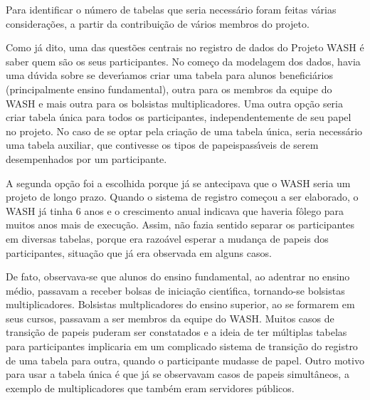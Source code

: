 \documentclass[
12pt,		%
openright,	%
twoside,  %
a4paper,			%
chapter=TITLE,		%
english,			%
french,				%
spanish,			%
brazil				%
]{USPSC-classe/USPSC}
\begin{document}
Para identificar o n\'umero de tabelas que seria necess\'ario foram feitas v\'arias considera\c{c}\~oes, a partir da contribui\c{c}\~ao de v\'arios membros do projeto.














Como j\'a dito, uma das quest\~oes centrais no registro de dados do Projeto WASH \'e saber quem s\~ao os seus participantes. No come\c{c}o da modelagem dos dados, havia uma d\'uvida sobre se dever\'{\i}amos criar uma tabela para alunos benefici\'arios (principalmente ensino fundamental), outra para os membros da equipe do WASH e mais outra para os bolsistas multiplicadores. Uma outra op\c{c}\~ao seria criar tabela \'unica para todos os participantes, independentemente de seu papel no projeto. No caso de se optar pela cria\c{c}\~ao de uma tabela \'unica, seria necess\'ario uma tabela auxiliar, que contivesse os \textquotedbl tipos de papeis\textquotedbl  pass\'{\i}veis de serem desempenhados por um participante.














A segunda op\c{c}\~ao foi a escolhida porque j\'a se antecipava que o WASH seria um projeto de longo prazo. Quando o sistema de registro come\c{c}ou a ser elaborado, o WASH j\'a tinha 6 anos e o crescimento anual indicava que haveria f\^olego para muitos anos mais de execu\c{c}\~ao. Assim, n\~ao fazia sentido separar os participantes em diversas tabelas, porque era razo\'avel esperar a mudan\c{c}a de papeis dos participantes, situa\c{c}\~ao que j\'a era observada em alguns casos.














De fato, observava-se que alunos do ensino fundamental, ao adentrar no ensino m\'edio, passavam a receber bolsas de inicia\c{c}\~ao cient\'{\i}fica, tornando-se bolsistas multiplicadores. Bolsistas multplicadores do ensino superior, ao se formarem em seus cursos, passavam a ser membros da equipe do WASH. Muitos casos de transi\c{c}\~ao de papeis puderam ser constatados e a ideia de ter m\'ultiplas tabelas para participantes implicaria em um complicado sistema de transi\c{c}\~ao do registro de uma tabela para outra, quando o participante mudasse de papel. Outro motivo para usar a tabela \'unica \'e que j\'a se observavam casos de papeis simult\^aneos, a exemplo de multiplicadores que tamb\'em eram servidores p\'ublicos.
\end{document}
